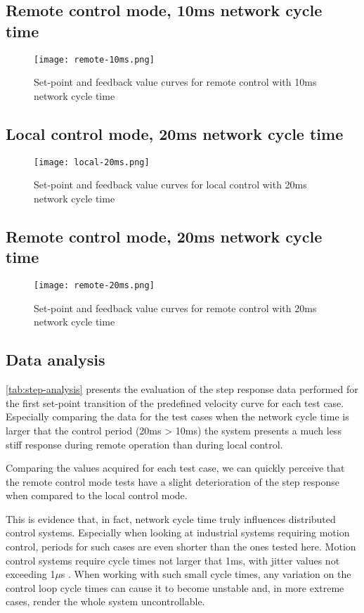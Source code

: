 \subsection*{Remote control mode, 10ms network cycle time}
\begin{figure}[H]
	\centering
	\texttt{[image: remote-10ms.png]}
	\caption{Set-point and feedback value curves for remote control with 10ms network cycle time}
	\label{fig:remote-10ms}
\end{figure}

\subsection*{Local control mode, 20ms network cycle time}
\begin{figure}[H]
	\centering
	\texttt{[image: local-20ms.png]}
	\caption{Set-point and feedback value curves for local control with 20ms network cycle time}
	\label{fig:local-20ms}
\end{figure}

\subsection*{Remote control mode, 20ms network cycle time}
\begin{figure}[H]
	\centering
	\texttt{[image: remote-20ms.png]}
	\caption{Set-point and feedback value curves for remote control with 20ms network cycle time}
	\label{fig:remote-20ms}
\end{figure}

\subsection{Data analysis}

\autoref{tab:step-analysis} presents the evaluation of the step response data performed for the first set-point transition of the predefined velocity curve for each test case.
Especially comparing the data for the test cases when the network cycle time is larger that the control period (20ms > 10ms) the system presents a much less stiff response during remote operation than during local control.

Comparing the values acquired for each test case, we can quickly perceive that the remote control mode tests have a slight deterioration of the step response when compared to the local control mode.

This is evidence that, in fact, network cycle time truly influences distributed control systems.
Especially when looking at industrial systems requiring motion control, periods for such cases are even shorter than the ones tested here.
Motion control systems require cycle times not larger that 1ms, with jitter values not exceeding 1$\mu$s \cite{rte:rte-for-automation}.
When working with such small cycle times, any variation on the control loop cycle times can cause it to become unstable and, in more extreme cases, render the whole system uncontrollable.

